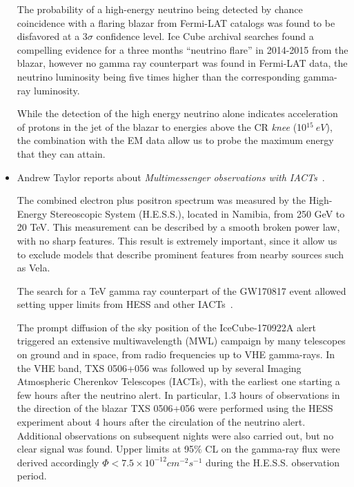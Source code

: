 \documentclass{PoS}
\begin{document}
\begin{itemize}
The probability of a high-energy neutrino being detected by chance coincidence with a flaring blazar from Fermi-LAT catalogs was found to be disfavored at a 3$\sigma$ confidence level. Ice Cube archival searches  found a compelling evidence for a three months ``neutrino flare'' in 2014-2015 from the blazar, however no gamma ray  counterpart was found in Fermi-LAT data, the neutrino luminosity being five times higher than the corresponding gamma-ray luminosity.

While the detection of the high energy neutrino alone indicates acceleration of protons in the jet of the blazar to energies above the CR \textit{knee} (10$^{15}~eV$), the combination with the EM data allow us to probe the maximum energy that they can attain.

\item Andrew Taylor reports about {\it Multimessenger observations with IACTs}~\cite{Taylor}.

The combined electron plus positron spectrum was measured by the High-Energy Stereoscopic System (H.E.S.S.), located in Namibia, from 250 GeV to 20 TeV. This measurement can be described by a smooth broken power law, with no sharp features. This result is extremely important, since it allow us to exclude models that describe prominent features from nearby sources such as Vela.

The search for a TeV gamma ray counterpart of the GW170817 event allowed setting upper limits from HESS and other IACTs~\cite{TheMMpaper}.


The prompt diffusion of the sky position of the IceCube-170922A alert triggered an extensive multiwavelength (MWL) campaign by many telescopes on ground and in space, from radio frequencies up to VHE gamma-rays. In the VHE band, TXS 0506+056 was followed up by several Imaging Atmospheric Cherenkov Telescopes (IACTs), with the earliest one starting a few hours after the neutrino alert. In particular,  1.3 hours of observations in the direction of the blazar TXS 0506+056 were performed using the HESS experiment about 4 hours after the circulation of the neutrino alert. Additional observations on subsequent nights were also carried out, but no clear signal was found. Upper limits at 95$\%$ CL on the gamma-ray flux were derived accordingly 
$ \Phi < 7.5 \times 10^{-12} cm^{-2} s^{-1} $ 
during the H.E.S.S. observation period. 



\end{itemize}
\end{document}
